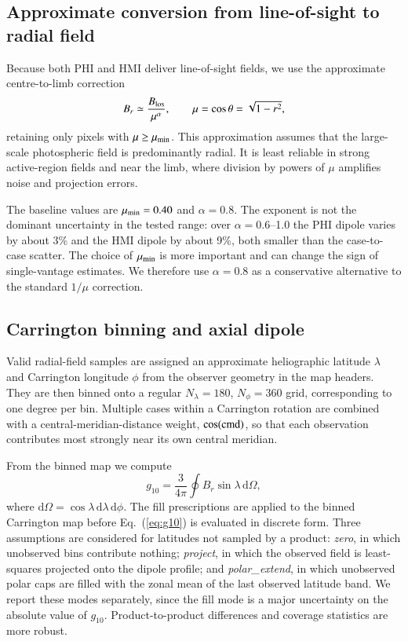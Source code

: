 \documentclass{aa}
\begin{document}
\subsection{Approximate conversion from line-of-sight to radial field}
\label{sec:methods-radial}

Because both PHI and HMI deliver line-of-sight fields, we use the approximate centre-to-limb correction
\begin{equation}
    B_r \simeq \frac{B_{\rm los}}{\mu^{\alpha}}, \qquad \mu=\cos\theta=\sqrt{1-r^2},
    \label{eq:br}
\end{equation}
retaining only pixels with $\mu\ge\mu_{\rm min}$. This approximation assumes that the large-scale photospheric field is predominantly radial. It is least reliable in strong active-region fields and near the limb, where division by powers of $\mu$ amplifies noise and projection errors.

The baseline values are $\mu_{\rm min}=0.40$ and $\alpha=0.8$. The exponent is not the dominant uncertainty in the tested range: over $\alpha=0.6$--1.0 the PHI dipole varies by about 3\% and the HMI dipole by about 9\%, both smaller than the case-to-case scatter. The choice of $\mu_{\rm min}$ is more important and can change the sign of single-vantage estimates. We therefore use $\alpha=0.8$ as a conservative alternative to the standard $1/\mu$ correction.

\subsection{Carrington binning and axial dipole}
\label{sec:methods-dipole}

Valid radial-field samples are assigned an approximate heliographic latitude $\lambda$ and Carrington longitude $\phi$ from the observer geometry in the map headers. They are then binned onto a regular $N_{\lambda}=180$, $N_{\phi}=360$ grid, corresponding to one degree per bin. Multiple cases within a Carrington rotation are combined with a central-meridian-distance weight, $\cos({\rm cmd})$, so that each observation contributes most strongly near its own central meridian.

From the binned map we compute
\begin{equation}
    g_{10} = \frac{3}{4\pi} \oint B_r \sin\lambda\,\mathrm{d}\Omega,
    \label{eq:g10}
\end{equation}
where $\mathrm{d}\Omega=\cos\lambda\,\mathrm{d}\lambda\,\mathrm{d}\phi$. The fill prescriptions are applied to the binned Carrington map before Eq.~(\ref{eq:g10}) is evaluated in discrete form. Three assumptions are considered for latitudes not sampled by a product: \emph{zero}, in which unobserved bins contribute nothing; \emph{project}, in which the observed field is least-squares projected onto the dipole profile; and \emph{polar\_extend}, in which unobserved polar caps are filled with the zonal mean of the last observed latitude band. We report these modes separately, since the fill mode is a major uncertainty on the absolute value of $g_{10}$. Product-to-product differences and coverage statistics are more robust.
\end{document}

